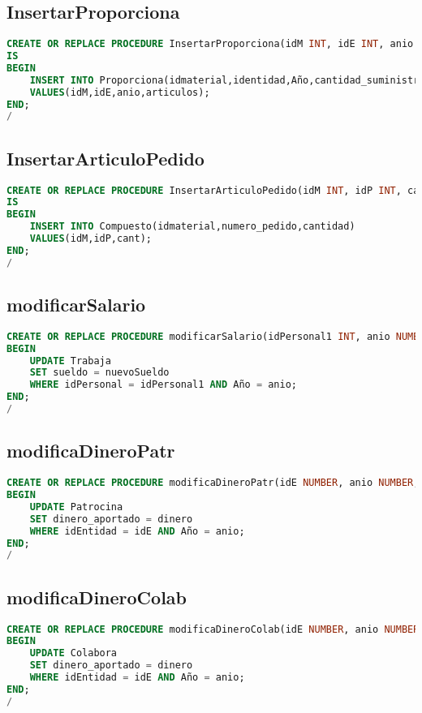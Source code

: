\subsection{InsertarProporciona}
\begin{lstlisting}[language=sql]
CREATE OR REPLACE PROCEDURE InsertarProporciona(idM INT, idE INT, anio INT, articulos INT)
IS
BEGIN
	INSERT INTO Proporciona(idmaterial,identidad,Año,cantidad_suministrada)
	VALUES(idM,idE,anio,articulos);
END;
/
\end{lstlisting}

\subsection{InsertarArticuloPedido}
\begin{lstlisting}[language=sql]
CREATE OR REPLACE PROCEDURE InsertarArticuloPedido(idM INT, idP INT, cant INT)
IS
BEGIN
	INSERT INTO Compuesto(idmaterial,numero_pedido,cantidad)
	VALUES(idM,idP,cant);
END;
/
\end{lstlisting}

\subsection{modificarSalario}
\begin{lstlisting}[language=sql]
CREATE OR REPLACE PROCEDURE modificarSalario(idPersonal1 INT, anio NUMBER, nuevoSueldo NUMBER) AS
BEGIN
    UPDATE Trabaja
    SET sueldo = nuevoSueldo
    WHERE idPersonal = idPersonal1 AND Año = anio;
END;
/
\end{lstlisting}

\subsection{modificaDineroPatr}
\begin{lstlisting}[language=sql]
CREATE OR REPLACE PROCEDURE modificaDineroPatr(idE NUMBER, anio NUMBER, dinero NUMBER) AS
BEGIN
    UPDATE Patrocina
    SET dinero_aportado = dinero
    WHERE idEntidad = idE AND Año = anio;
END;
/
\end{lstlisting}

\subsection{modificaDineroColab}
\begin{lstlisting}[language=sql]
CREATE OR REPLACE PROCEDURE modificaDineroColab(idE NUMBER, anio NUMBER, dinero NUMBER) AS
BEGIN
    UPDATE Colabora
    SET dinero_aportado = dinero
    WHERE idEntidad = idE AND Año = anio;
END;
/
\end{lstlisting}

